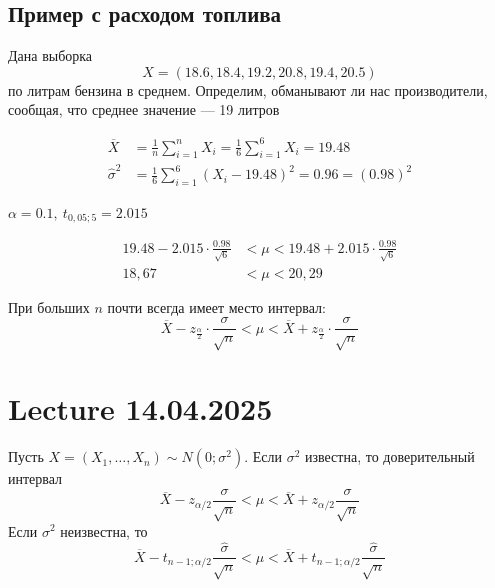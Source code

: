 \documentclass[a4paper, 10pt]{article}
\begin{document}
\subsection{Пример с расходом топлива}
Дана выборка 
\begin{equation*}
    X=(18.6,18.4,19.2,20.8,19.4,20.5)
\end{equation*}
по литрам бензина в среднем. Определим, обманывают ли нас производители, сообщая, что среднее значение — 19 литров

\begin{equation*}
    \begin{aligned}
        \overline{X}&=\frac{1}{n}\sum_{i=1}^nX_i=\frac{1}{6}\sum_{i=1}^6X_i=19.48\\
        \widehat{\sigma}^{2}&=\frac{1}{6} \sum_{i=1}^{6}\left(X_{i}-19.48\right)^{2}=0.96=(0.98)^{2}
    \end{aligned}
\end{equation*}

$\alpha=0.1,\ t_{0,05;5}=2.015$

\begin{equation*}
\begin{aligned}
    19.48-2.015 \cdot \frac{0.98}{\sqrt{6}}&<\mu<19.48+2.015 \cdot \frac{0.98}{\sqrt{6}}\\
    18,67&<\mu<20,29
\end{aligned}
\end{equation*}

\comment При больших $n$ почти всегда имеет место интервал:
\begin{equation*}
    \overline{X}-z_{\frac{\alpha}{2}}\cdot\frac{\sigma}{\sqrt{n}}<\mu<\overline{X}+z_{\frac{\alpha}{2}}\cdot\frac{\sigma}{\sqrt{n}}
\end{equation*}


\newpage
\section{Lecture 14.04.2025}
Пусть $X=(X_1,\ldots,X_n)\sim N(0;\sigma^2)$. Если $\sigma^2$ известна, то доверительный интервал 
\begin{equation*}
    \overline{X}-z_{\alpha/2}\frac{\sigma}{\sqrt{n}}<\mu<\overline{X}+z_{\alpha/2}\frac{\sigma}{\sqrt{n}}
\end{equation*}
Если $\sigma^2$ неизвестна, то 
\begin{equation*}
    \overline{X}-t_{n-1;\alpha/2}\frac{\widehat{\sigma}}{\sqrt{n}}<\mu<\overline{X}+t_{n-1;\alpha/2}\frac{\widehat{\sigma}}{\sqrt{n}}
\end{equation*}
\end{document}
